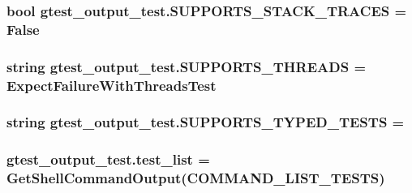 \subsubsection[{\texorpdfstring{S\+U\+P\+P\+O\+R\+T\+S\+\_\+\+S\+T\+A\+C\+K\+\_\+\+T\+R\+A\+C\+ES}{SUPPORTS_STACK_TRACES}}]{\setlength{\rightskip}{0pt plus 5cm}bool gtest\+\_\+output\+\_\+test.\+S\+U\+P\+P\+O\+R\+T\+S\+\_\+\+S\+T\+A\+C\+K\+\_\+\+T\+R\+A\+C\+ES = False}\hypertarget{namespacegtest__output__test_a1e8e722c50268029e33d6fde753cff54}{}\label{namespacegtest__output__test_a1e8e722c50268029e33d6fde753cff54}
\subsubsection[{\texorpdfstring{S\+U\+P\+P\+O\+R\+T\+S\+\_\+\+T\+H\+R\+E\+A\+DS}{SUPPORTS_THREADS}}]{\setlength{\rightskip}{0pt plus 5cm}string gtest\+\_\+output\+\_\+test.\+S\+U\+P\+P\+O\+R\+T\+S\+\_\+\+T\+H\+R\+E\+A\+DS = \textquotesingle{}Expect\+Failure\+With\+Threads\+Test\textquotesingle{}}\hypertarget{namespacegtest__output__test_a9c611ee196914defbb5d32a47c606640}{}\label{namespacegtest__output__test_a9c611ee196914defbb5d32a47c606640}
\subsubsection[{\texorpdfstring{S\+U\+P\+P\+O\+R\+T\+S\+\_\+\+T\+Y\+P\+E\+D\+\_\+\+T\+E\+S\+TS}{SUPPORTS_TYPED_TESTS}}]{\setlength{\rightskip}{0pt plus 5cm}string gtest\+\_\+output\+\_\+test.\+S\+U\+P\+P\+O\+R\+T\+S\+\_\+\+T\+Y\+P\+E\+D\+\_\+\+T\+E\+S\+TS = \textquotesingle{}}\hypertarget{namespacegtest__output__test_aa762abdf62ac6efe1aa2405b3f506380}{}\label{namespacegtest__output__test_aa762abdf62ac6efe1aa2405b3f506380}
\subsubsection[{\texorpdfstring{test\+\_\+list}{test_list}}]{\setlength{\rightskip}{0pt plus 5cm}gtest\+\_\+output\+\_\+test.\+test\+\_\+list = {\bf Get\+Shell\+Command\+Output}({\bf C\+O\+M\+M\+A\+N\+D\+\_\+\+L\+I\+S\+T\+\_\+\+T\+E\+S\+TS})}\hypertarget{namespacegtest__output__test_aec4b3602697dfdee3283be82c5fe6232}{}\label{namespacegtest__output__test_aec4b3602697dfdee3283be82c5fe6232}
